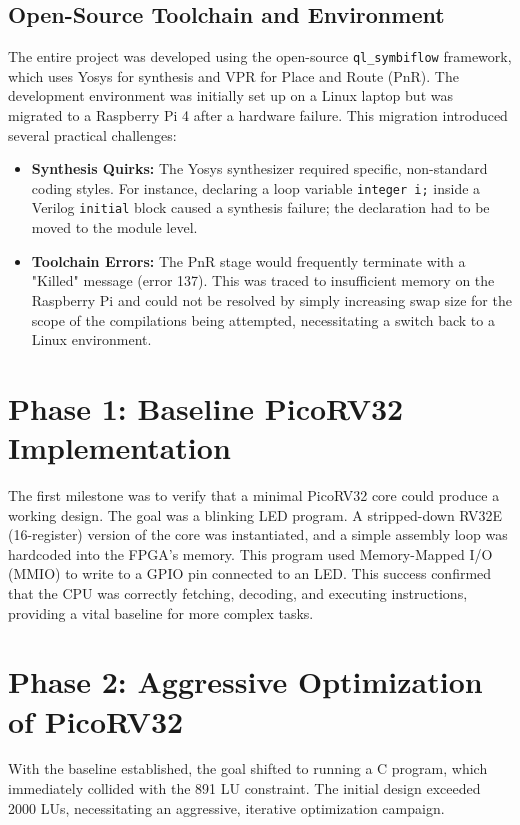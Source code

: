 \documentclass[conference]{IEEEtran}
\begin{document}
\subsection{Open-Source Toolchain and Environment}
The entire project was developed using the open-source \verb|ql_symbiflow| framework, which uses Yosys for synthesis and VPR for Place and Route (PnR). The development environment was initially set up on a Linux laptop but was migrated to a Raspberry Pi 4 after a hardware failure. This migration introduced several practical challenges:
\begin{itemize}
    \item \textbf{Synthesis Quirks:} The Yosys synthesizer required specific, non-standard coding styles. For instance, declaring a loop variable \verb|integer i;| inside a Verilog \verb|initial| block caused a synthesis failure; the declaration had to be moved to the module level.
    \item \textbf{Toolchain Errors:} The PnR stage would frequently terminate with a "Killed" message (error 137). This was traced to insufficient memory on the Raspberry Pi and could not be resolved by simply increasing swap size for the scope of the compilations being attempted, necessitating a switch back to a Linux environment.
\end{itemize}

\section{Phase 1: Baseline PicoRV32 Implementation}
The first milestone was to verify that a minimal PicoRV32 core could produce a working design. The goal was a blinking LED program. A stripped-down RV32E (16-register) version of the core was instantiated, and a simple assembly loop was hardcoded into the FPGA's memory. This program used Memory-Mapped I/O (MMIO) to write to a GPIO pin connected to an LED. This success confirmed that the CPU was correctly fetching, decoding, and executing instructions, providing a vital baseline for more complex tasks.

\section{Phase 2: Aggressive Optimization of PicoRV32}
With the baseline established, the goal shifted to running a C program, which immediately collided with the 891 LU constraint. The initial design exceeded 2000 LUs, necessitating an aggressive, iterative optimization campaign.
\end{document}
